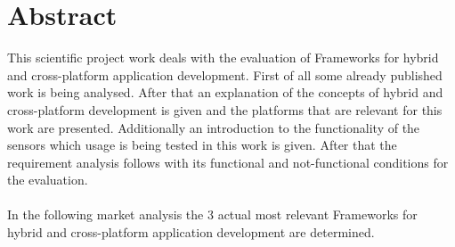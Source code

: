 \chapter*{Abstract}

This scientific project work deals with the evaluation of Frameworks for hybrid and cross-platform application development. First of all some already published work is being analysed. After that an explanation of the concepts of hybrid and cross-platform development is given and the platforms that are relevant for this work are presented. Additionally an introduction to the functionality of the sensors which usage is being tested in this work is given. After that the requirement analysis follows with its functional and not-functional conditions for the evaluation.
\\
\\
In the following market analysis the 3 actual most relevant Frameworks for hybrid and cross-platform application development are determined.
